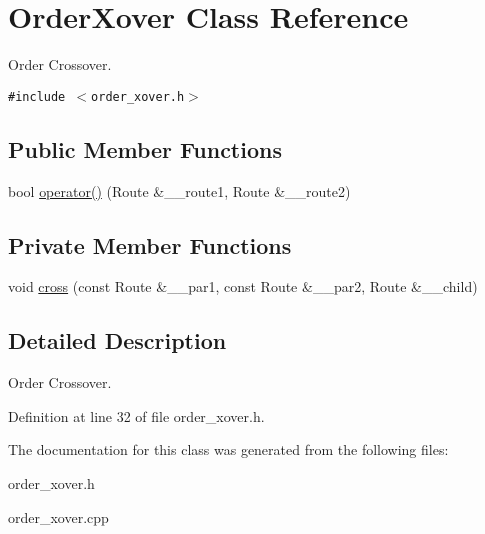 \hypertarget{classOrderXover}{
\section{Order\-Xover Class Reference}
\label{classOrderXover}
}
Order Crossover.  


{\tt \#include $<$order\_\-xover.h$>$}

\subsection*{Public Member Functions}
\begin{CompactItemize}
\item 
\hypertarget{classOrderXover_0ff6aada669eb8173322ed68cda1ac61}{
bool \hyperlink{classOrderXover_0ff6aada669eb8173322ed68cda1ac61}{operator()} (Route \&\_\-\_\-route1, Route \&\_\-\_\-route2)}
\label{classOrderXover_0ff6aada669eb8173322ed68cda1ac61}

\end{CompactItemize}
\subsection*{Private Member Functions}
\begin{CompactItemize}
\item 
\hypertarget{classOrderXover_d2bf90b5f46ac4a344777e17bc5f364d}{
void \hyperlink{classOrderXover_d2bf90b5f46ac4a344777e17bc5f364d}{cross} (const Route \&\_\-\_\-par1, const Route \&\_\-\_\-par2, Route \&\_\-\_\-child)}
\label{classOrderXover_d2bf90b5f46ac4a344777e17bc5f364d}

\end{CompactItemize}


\subsection{Detailed Description}
Order Crossover. 



Definition at line 32 of file order\_\-xover.h.

The documentation for this class was generated from the following files:\begin{CompactItemize}
\item 
order\_\-xover.h\item 
order\_\-xover.cpp\end{CompactItemize}
